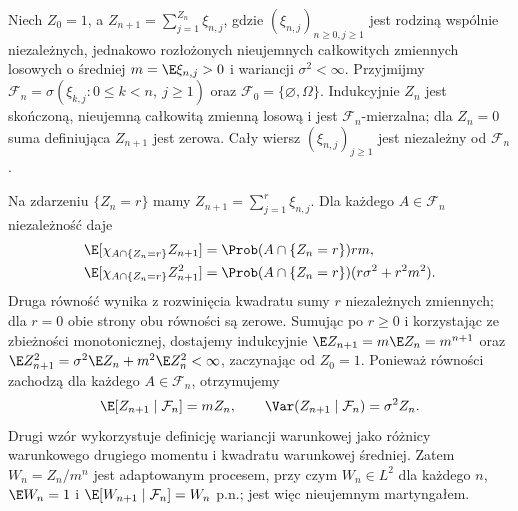 \begin{przyklad}
Niech $Z_0=1$, a
$Z_{n+1}=\sum_{j=1}^{Z_n}\xi_{n,j}$, gdzie
$(\xi_{n,j})_{n\geq0,j\geq1}$ jest rodziną
wspólnie niezależnych, jednakowo rozłożonych
nieujemnych całkowitych zmiennych losowych
o średniej $m=\E\xi_{n,j}>0$ i wariancji
$\sigma^2<\infty$. Przyjmijmy
$\mathcal F_n=\sigma(\xi_{k,j}:0\leq k<n,\ j\geq1)$
oraz $\mathcal F_0=\{\varnothing,\Omega\}$.
Indukcyjnie $Z_n$ jest skończoną, nieujemną
całkowitą zmienną losową i jest $\mathcal F_n$-mierzalna;
dla $Z_n=0$ suma definiująca $Z_{n+1}$ jest zerowa.
Cały wiersz $(\xi_{n,j})_{j\geq1}$ jest niezależny
od $\mathcal F_n$.

Na zdarzeniu $\{Z_n=r\}$ mamy
$Z_{n+1}=\sum_{j=1}^r\xi_{n,j}$. Dla każdego
$A\in\mathcal F_n$ niezależność daje
\begin{align*}
\E[\chi_{A\cap\{Z_n=r\}}Z_{n+1}]
 &=\Prob(A\cap\{Z_n=r\})rm,\\
\E[\chi_{A\cap\{Z_n=r\}}Z_{n+1}^2]
 &=\Prob(A\cap\{Z_n=r\})(r\sigma^2+r^2m^2).
\end{align*}
Druga równość wynika z rozwinięcia kwadratu
sumy $r$ niezależnych zmiennych; dla $r=0$
obie strony obu równości są zerowe.
Sumując po $r\geq0$ i korzystając ze zbieżności
monotonicznej, dostajemy indukcyjnie
$\E Z_{n+1}=m\E Z_n=m^{n+1}$ oraz
$\E Z_{n+1}^2=\sigma^2\E Z_n+m^2\E Z_n^2<\infty$,
zaczynając od $Z_0=1$.
Ponieważ równości zachodzą dla każdego
$A\in\mathcal F_n$, otrzymujemy
\[
\E[Z_{n+1}\mid\mathcal F_n]=mZ_n,\qquad
\Var(Z_{n+1}\mid\mathcal F_n)=\sigma^2Z_n.
\]
Drugi wzór wykorzystuje definicję wariancji
warunkowej jako różnicy warunkowego drugiego
momentu i kwadratu warunkowej średniej.
Zatem $W_n=Z_n/m^n$ jest adaptowanym procesem,
przy czym $W_n\in L^2$ dla każdego $n$,
$\E W_n=1$ i
$\E[W_{n+1}\mid\mathcal F_n]=W_n$ p.n.;
jest więc nieujemnym martyngałem.


\end{przyklad}
